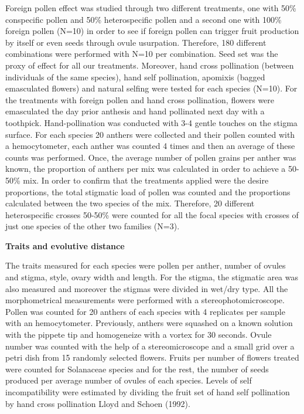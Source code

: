 \documentclass[11pt,a4paper]{article}
\begin{document}
Foreign pollen effect was studied through two different treatments, one
with 50\% conspecific pollen and 50\% heterospecific pollen and a second
one with 100\% foreign pollen (N=10) in order to see if foreign pollen
can trigger fruit production by itself or even seeds through ovule
usurpation. Therefore, 180 different combinations were performed with
N=10 per combination. Seed set was the proxy of effect for all our
treatments. Moreover, hand cross pollination (between individuals of the
same species), hand self pollination, apomixis (bagged emasculated
flowers) and natural selfing were tested for each species (N=10). For
the treatments with foreign pollen and hand cross pollination, flowers
were emasculated the day prior anthesis and hand pollinated next day
with a toothpick. Hand-pollination was conducted with 3-4 gentle touches
on the stigma surface. For each species 20 anthers were collected and
their pollen counted with a hemocytometer, each anther was counted 4
times and then an average of these counts was performed. Once, the
average number of pollen grains per anther was known, the proportion of
anthers per mix was calculated in order to achieve a 50-50\% mix. In
order to confirm that the treatments applied were the desire
proportions, the total stigmatic load of pollen was counted and the
proportions calculated between the two species of the mix. Therefore, 20
different heterospecific crosses 50-50\% were counted for all the focal
species with crosses of just one species of the other two families
(N=3).

\textbf{Traits and evolutive distance}

The traits measured for each species were pollen per anther, number of
ovules and stigma, style, ovary width and length. For the stigma, the
stigmatic area was also measured and moreover the stigmas were divided
in wet/dry type. All the morphometrical measurements were performed with
a stereophotomicroscope. Pollen was counted for 20 anthers of each
species with 4 replicates per sample with an hemocytometer. Previously,
anthers were squashed on a known solution with the pippete tip and
homogeneize with a vortex for 30 seconds. Ovule number was counted with
the help of a stereomicroscope and a small grid over a petri dish from
15 randomly selected flowers. Fruits per number of flowers treated were
counted for Solanaceae species and for the rest, the number of seeds
produced per average number of ovules of each species. Levels of self
incompatibility were estimated by dividing the fruit set of hand self
pollination by hand cross pollination Lloyd and Schoen (1992).
\end{document}
